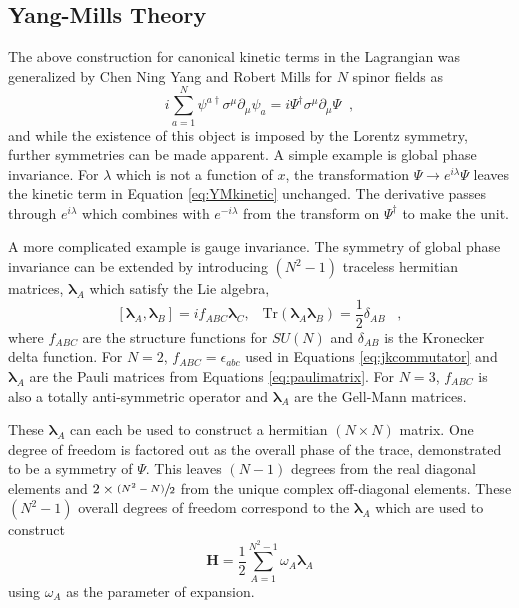 \subsection{Yang-Mills Theory}
The above construction for canonical kinetic terms in the 
 Lagrangian was generalized by Chen Ning Yang
 and Robert Mills %
 for $N$ %
 spinor fields as
\begin{equation}\label{eq:YMkinetic}
 i\sum_{a=1}^{N} \psi^{a\dagger}\sigma^\mu\partial_\mu\psi_a
  = i\Psi^\dagger\sigma^\mu\partial_\mu\Psi \;\;,
\end{equation}
  and while the existence of this object is imposed by the
  Lorentz symmetry, further symmetries can be
  made apparent.
 A simple example %
  is global phase invariance. 
 For $\lambda$ which is not a function of $x$,
  the transformation $\Psi\rightarrow e^{i\lambda}\Psi$
  leaves the kinetic term in 
  Equation \ref{eq:YMkinetic} unchanged.
 The derivative passes through $e^{i\lambda}$
  which combines with $e^{-i\lambda}$ from 
  the transform on $\Psi^\dagger$
  to make the unit.

 A more complicated example is gauge invariance. 
 The symmetry of global phase invariance can be extended
  by introducing $(N^2-1)$ traceless hermitian matrices,
  $\boldsymbol{\lambda}_A$ which satisfy the Lie algebra,
\begin{equation}\label{eq:lielambda}
[\boldsymbol{\lambda}_A,\boldsymbol{\lambda}_B] = 
 if_{ABC}\boldsymbol{\lambda}_C, \;\;\;
 \mathrm{Tr}\left(\boldsymbol{\lambda}_A\boldsymbol{\lambda}_B\right) =
 \frac{1}{2}\delta_{AB} \;\;\;,
\end{equation}
  where $f_{ABC}$ are the structure functions for $SU(N)$
  and $\delta_{AB}$ is the Kronecker delta function.
 For $N=2$, $f_{ABC}=\epsilon_{abc}$ used in
  Equations \ref{eq:jkcommutator} and $\boldsymbol{\lambda}_A$
  are the Pauli matrices from Equations \ref{eq:paulimatrix}.
 For $N=3$, $f_{ABC}$ is also a totally anti-symmetric operator
  and $\boldsymbol{\lambda}_A$ are the Gell-Mann matrices.

 These $\boldsymbol{\lambda}_A$ can each be used to construct a 
  hermitian $(N\times N)$ matrix. 
 One degree of freedom is factored out 
  as the overall phase of the trace,
  demonstrated to be a symmetry of $\Psi$.
 This leaves $(N-1)$ degrees from the real 
  diagonal elements and $2\times\sfrac{(N^2-N)}{2}$ 
  from the unique complex off-diagonal elements.
 These $(N^2-1)$ overall degrees of freedom
  correspond to the $\boldsymbol{\lambda}_A$
  which are used to construct
\begin{equation}\label{eq:hmatrix}
 \mathbf{H}=
  \frac{1}{2}\sum_{A=1}^{N^2-1}
  \omega_A\boldsymbol{\lambda}_A
\end{equation}
  using $\omega_A$ as the parameter of expansion.

